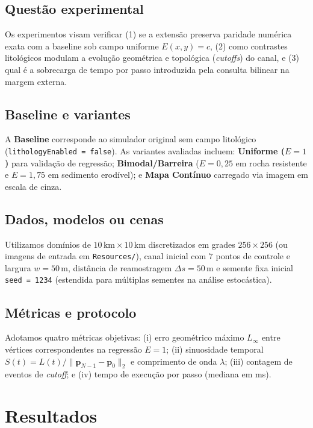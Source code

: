 \documentclass[9pt,a4paper,twocolumn]{extarticle}
\newif\ifmostrarorientacoes
\newcommand{\orientacao}[1]{%
  \ifmostrarorientacoes
    \par\smallskip
    \noindent\fcolorbox{black!35}{black!4}{%
      \parbox{0.94\columnwidth}{\fontsize{7.4}{8.2}\selectfont\textbf{Orientação aos autores:} #1}%
    }%
    \par\smallskip
  \fi
}
\begin{document}
\subsection{Questão experimental}
Os experimentos visam verificar (1) se a extensão preserva paridade numérica exata com a baseline sob campo uniforme $E(x,y) = c$, (2) como contrastes litológicos modulam a evolução geométrica e topológica (\textit{cutoffs}) do canal, e (3) qual é a sobrecarga de tempo por passo introduzida pela consulta bilinear na margem externa.

\subsection{Baseline e variantes}
A \textbf{Baseline} corresponde ao simulador original sem campo litológico (\texttt{lithologyEnabled = false}). As variantes avaliadas incluem: \textbf{Uniforme ($E=1$)} para validação de regressão; \textbf{Bimodal/Barreira} ($E = 0{,}25$ em rocha resistente e $E = 1{,}75$ em sedimento erodível); e \textbf{Mapa Contínuo} carregado via imagem em escala de cinza.

\subsection{Dados, modelos ou cenas}
Utilizamos domínios de $10\,\text{km} \times 10\,\text{km}$ discretizados em grades $256 \times 256$ (ou imagens de entrada em \texttt{Resources/}), canal inicial com $7$ pontos de controle e largura $w = 50\,\text{m}$, distância de reamostragem $\Delta s = 50\,\text{m}$ e semente fixa inicial \texttt{seed = 1234} (estendida para múltiplas sementes na análise estocástica).

\subsection{Métricas e protocolo}
Adotamos quatro métricas objetivas: (i) erro geométrico máximo $L_\infty$ entre vértices correspondentes na regressão $E=1$; (ii) sinuosidade temporal $S(t) = L(t)/\|\mathbf{p}_{N-1} - \mathbf{p}_0\|_2$ e comprimento de onda $\lambda$; (iii) contagem de eventos de \textit{cutoff}; e (iv) tempo de execução por passo (mediana em ms).

\section{Resultados}
\orientacao{Apresente resultados quantitativos e visuais. Toda tabela e figura deve ser
citada no texto e responder a uma questão experimental. Evite imagens meramente decorativas.}
\end{document}
